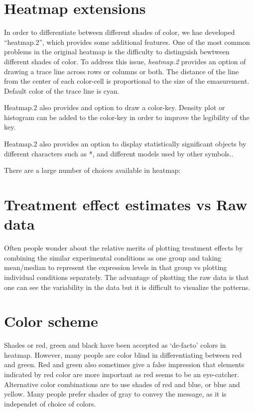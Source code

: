 \documentclass[12pt, oneside, letterpaper]{article}
\begin{document}
\section*{Heatmap extensions}

	In order to differentiate between different shades of color,
	we hae developed ``heatmap.2'', which provides some
	additional features. One of the most common problems in the
	original heatmap is the difficulty to distinguish bewtween
	different shades of color. To address this issue,
	\textit{heatmap.2} provides an option of drawing a trace
	line across rows or columns or both. The distance of the
	line from the center of each color-cell is proportional to
	the size of the emasurement. Default color of the trace line
	is cyan.

Heatmap.2 also provides and option to draw a color-key. Density plot
or histogram can be added to the color-key in order to improve the
legibility of the key.

Heatmap.2 also provides an option to display statistically
significant objects by different characters such as *, and different
models used by other symbols..
	
There are a large number of choices available in heatmap:

\section*{Treatment effect estimates vs Raw data}
        Often people wonder about the relative merits of plotting
        treatment effects by combining the similar experimental
        conditions as one group and taking mean/median to represent
        the expression levels in that group vs plotting individual
        conditions separately. The advantage of pkotting the raw
        data is that one can see the variability in the data but it
        is difficult to visualize the patterns.

\section*{Color scheme}
	Shades or red, green and black have been accepted as
	`de-facto' colors in heatmap. However, many people are color
	blind in differentiating between red and green. Red and
	green also sometimes give a false impression that elements
	indicated by red color are more important as red seems to be
	an eye-catcher. Alternative color combinations are to use
	shades of red and blue, or blue and yellow. Many people
	prefer shades of gray to convey the message, as it is
	independet of choice of colors.
\end{document}
